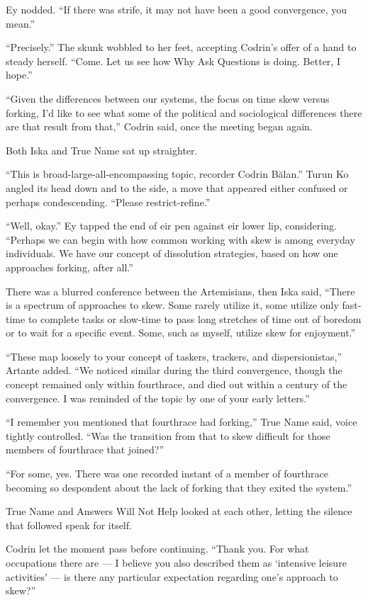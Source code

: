 Ey nodded. ``If there was strife, it may not have been a good convergence, you mean.''

``Precisely.'' The skunk wobbled to her feet, accepting Codrin's offer of a hand to steady herself. ``Come. Let us see how Why Ask Questions is doing. Better, I hope.''

``Given the differences between our systems, the focus on time skew versus forking, I'd like to see what some of the political and sociological differences there are that result from that,'' Codrin said, once the meeting began again.

Both Iska and True Name sat up straighter.

``This is broad-large-all-encompassing topic, recorder Codrin Bălan.'' Turun Ko angled its head down and to the side, a move that appeared either confused or perhaps condescending. ``Please restrict-refine.''

``Well, okay.'' Ey tapped the end of eir pen against eir lower lip, considering. ``Perhaps we can begin with how common working with skew is among everyday individuals. We have our concept of dissolution strategies, based on how one approaches forking, after all.''

There was a blurred conference between the Artemisians, then Iska said, ``There is a spectrum of approaches to skew. Some rarely utilize it, some utilize only fast-time to complete tasks or slow-time to pass long stretches of time out of boredom or to wait for a specific event. Some, such as myself, utilize skew for enjoyment.''

``These map loosely to your concept of taskers, trackers, and dispersionistas,'' Artante added. ``We noticed similar during the third convergence, though the concept remained only within fourthrace, and died out within a century of the convergence. I was reminded of the topic by one of your early letters.''

``I remember you mentioned that fourthrace had forking,'' True Name said, voice tightly controlled. ``Was the transition from that to skew difficult for those members of fourthrace that joined?''

``For some, yes. There was one recorded instant of a member of fourthrace becoming so despondent about the lack of forking that they exited the system.''

True Name and Answers Will Not Help looked at each other, letting the silence that followed speak for itself.

Codrin let the moment pass before continuing. ``Thank you. For what occupations there are — I believe you also described them as `intensive leisure activities' — is there any particular expectation regarding one's approach to skew?''

